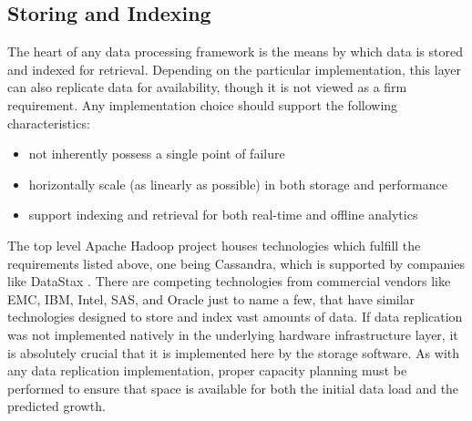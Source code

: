 \subsection{Storing and Indexing}
 The heart of any data processing framework is the means by which data is stored and indexed for retrieval. Depending on the particular implementation, this layer can also replicate data for availability, though it is not viewed as a firm requirement. Any implementation choice should support the following characteristics:
\begin{itemize}
	\item not inherently possess a single point of failure
	\item horizontally scale (as linearly as possible) in both storage and performance
	\item support indexing and retrieval for both real-time and offline analytics
\end{itemize}
The top level Apache Hadoop project houses technologies which fulfill the requirements listed above, one being Cassandra, which is supported by companies like DataStax \cite{cassandra}. There are competing technologies from commercial vendors like EMC, IBM, Intel, SAS, and Oracle just to name a few, that have similar technologies designed to store and index vast amounts of data. If data replication was not implemented natively in the underlying hardware infrastructure layer, it is absolutely crucial that it is implemented here by the storage software. As with any data replication implementation, proper capacity planning must be performed to ensure that space is available for both the initial data load and the predicted growth.\\

